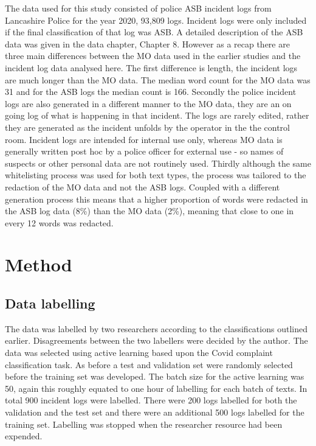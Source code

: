 The data used for this study consisted of police ASB incident logs from Lancashire Police for the year 2020,  93,809 logs. Incident logs were only included if the final classification of that log was ASB. A detailed description of the ASB data was given in the data chapter, Chapter 8.  However as a recap there are three main differences between the MO data used in the earlier studies and the incident log data analysed here. The first difference is length, the incident logs are much longer than the MO data. The median word count for the MO data was 31 and for the ASB logs the median count is 166. Secondly the police incident logs are also generated in a different manner to the MO data, they are an on going log of what is happening in that incident. The logs are rarely edited, rather they are generated as the incident unfolds by the operator in the the control room.  Incident logs are intended for internal use only, whereas MO data is generally written post hoc by a police officer for external use - so names of suspects or other personal data are not routinely used. Thirdly although the same whitelisting process was used for both text types, the process was tailored to the redaction of the MO data and not the ASB logs. Coupled with a different generation process this means that a higher proportion of words were redacted in the ASB log data (8\%) than the MO data (2\%), meaning that close to one in every 12 words was redacted.

\section{Method}


\subsection{Data labelling} The data was labelled by two researchers according to the classifications outlined earlier. Disagreements between the two labellers were decided by the author. The data was selected using active learning based upon the Covid complaint classification task. As before a test and validation set were randomly selected before the training set was developed. The batch size for the active learning was 50, again this roughly equated to one hour of labelling for each batch of texts. In total 900 incident logs were labelled. There were 200 logs labelled for both the validation and the test set and there were an additional 500 logs labelled for the training set. Labelling was stopped when the researcher resource had been expended.

